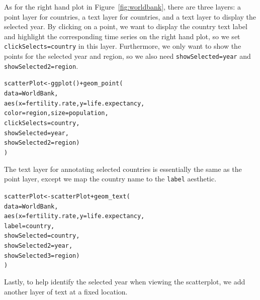 \documentclass[12pt]{article}\usepackage[]{graphicx}\usepackage[]{color}
\makeatletter
\newcommand{\hlopt}[1]{\textcolor[rgb]{0,0,0}{#1}}%
\newcommand{\hlstd}[1]{\textcolor[rgb]{0,0,0}{#1}}%
\newcommand{\hlkwb}[1]{\textcolor[rgb]{0,0,0}{#1}}%
\newcommand{\hlkwc}[1]{\textcolor[rgb]{0,0,1}{#1}}%
\newcommand{\hlkwd}[1]{\textcolor[rgb]{0,0,0}{#1}}%
\newenvironment{kframe}{%
 \def\at@end@of@kframe{}%
 \ifinner\ifhmode%
  \def\at@end@of@kframe{\end{minipage}}%
  \begin{minipage}{\columnwidth}%
 \fi\fi%
 \def\FrameCommand##1{\hskip\@totalleftmargin \hskip-\fboxsep
 \colorbox{shadecolor}{##1}\hskip-\fboxsep
     \hskip-\linewidth \hskip-\@totalleftmargin \hskip\columnwidth}%
 \MakeFramed {\advance\hsize-\width
   \@totalleftmargin\z@ \linewidth\hsize
   \@setminipage}}%
 {\par\unskip\endMakeFramed%
 \at@end@of@kframe}
\newenvironment{knitrout}{}{} %
\makeatother
\begin{document}
As for the right hand plot in Figure~\ref{fig:worldbank}, there are 
three layers: a point layer for countries, a text layer for countries, 
and a text layer to display the selected year. By clicking on a point,
we want to display the country text label and highlight the corresponding
time series on the right hand plot, so we set \texttt{clickSelects=country}
in this layer. Furthermore, we only want to show the points for the 
selected year and region, so we also need \texttt{showSelected=year} and 
\texttt{showSelected2=region}.

\begin{knitrout}
\color{fgcolor}\begin{kframe}
\begin{alltt}
\hlstd{scatterPlot} \hlkwb{<-} \hlkwd{ggplot}\hlstd{()} \hlopt{+} \hlkwd{geom_point}\hlstd{(}
  \hlkwc{data} \hlstd{= WorldBank,}
  \hlkwd{aes}\hlstd{(}\hlkwc{x} \hlstd{= fertility.rate,} \hlkwc{y} \hlstd{= life.expectancy,}
      \hlkwc{color} \hlstd{= region,} \hlkwc{size} \hlstd{= population,}
      \hlkwc{clickSelects} \hlstd{= country,}
      \hlkwc{showSelected} \hlstd{= year,}
      \hlkwc{showSelected2} \hlstd{= region)}
\hlstd{)}
\end{alltt}
\end{kframe}
\end{knitrout}

The text layer for annotating selected countries is essentially the same as the
point layer, except we map the country name to the \texttt{label} aesthetic.

\begin{knitrout}
\color{fgcolor}\begin{kframe}
\begin{alltt}
\hlstd{scatterPlot} \hlkwb{<-} \hlstd{scatterPlot} \hlopt{+} \hlkwd{geom_text}\hlstd{(}
  \hlkwc{data} \hlstd{= WorldBank,}
  \hlkwd{aes}\hlstd{(}\hlkwc{x} \hlstd{= fertility.rate,} \hlkwc{y} \hlstd{= life.expectancy,}
      \hlkwc{label} \hlstd{= country,}
      \hlkwc{showSelected} \hlstd{= country,}
      \hlkwc{showSelected2} \hlstd{= year,}
      \hlkwc{showSelected3} \hlstd{= region)}
\hlstd{)}
\end{alltt}
\end{kframe}
\end{knitrout}

Lastly, to help identify the selected year when viewing the scatterplot, 
we add another layer of text at a fixed location.
\end{document}

